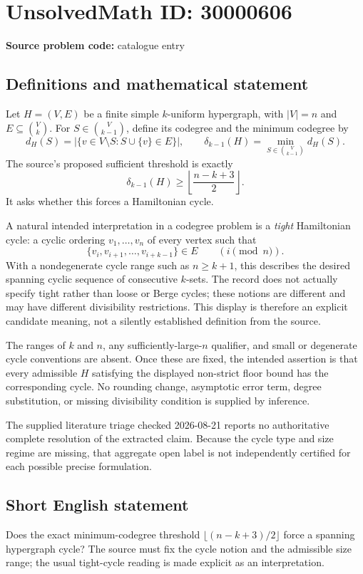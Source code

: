 \documentclass[11pt]{article}
\begin{document}
\section*{UnsolvedMath ID: 30000606}
\textbf{Source problem code:} catalogue entry
\subsection{Definitions and mathematical statement}
Let \(H=(V,E)\) be a finite simple \(k\)-uniform hypergraph, with \(|V|=n\) and \(E\subseteq\binom Vk\). For \(S\in\binom V{k-1}\), define its codegree and the minimum codegree by
\[
d_H(S)=|\{v\in V\setminus S:S\cup\{v\}\in E\}|,
\qquad\delta_{k-1}(H)=\min_{S\in\binom V{k-1}}d_H(S).
\]
The source's proposed sufficient threshold is exactly
\[
\delta_{k-1}(H)\geq\left\lfloor\frac{n-k+3}{2}\right\rfloor.
\]
It asks whether this forces a Hamiltonian cycle.

A natural intended interpretation in a codegree problem is a \emph{tight} Hamiltonian cycle: a cyclic ordering \(v_1,\ldots,v_n\) of every vertex such that
\[
\{v_i,v_{i+1},\ldots,v_{i+k-1}\}\in E\qquad(i\pmod n).
\]
With a nondegenerate cycle range such as \(n\geq k+1\), this describes the desired spanning cyclic sequence of consecutive \(k\)-sets. The record does not actually specify tight rather than loose or Berge cycles; these notions are different and may have different divisibility restrictions. This display is therefore an explicit candidate meaning, not a silently established definition from the source.

The ranges of \(k\) and \(n\), any sufficiently-large-\(n\) qualifier, and small or degenerate cycle conventions are absent. Once these are fixed, the intended assertion is that every admissible \(H\) satisfying the displayed non-strict floor bound has the corresponding cycle. No rounding change, asymptotic error term, degree substitution, or missing divisibility condition is supplied by inference.

The supplied literature triage checked 2026-08-21 reports no authoritative complete resolution of the extracted claim. Because the cycle type and size regime are missing, that aggregate open label is not independently certified for each possible precise formulation.
\subsection{Short English statement}
Does the exact minimum-codegree threshold \(\lfloor(n-k+3)/2\rfloor\) force a spanning hypergraph cycle? The source must fix the cycle notion and the admissible size range; the usual tight-cycle reading is made explicit as an interpretation.
\end{document}
